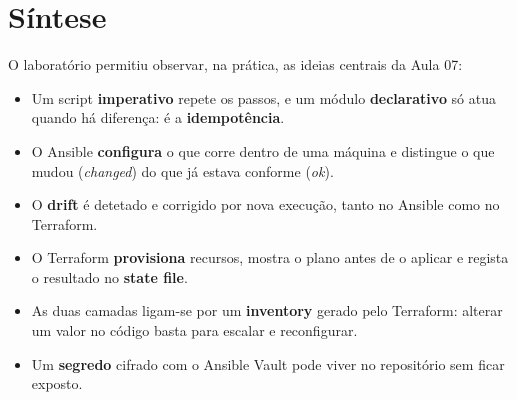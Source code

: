 \documentclass[11pt,a4paper]{article}
\begin{document}
\section*{Síntese}

O laboratório permitiu observar, na prática, as ideias centrais da Aula 07:

\begin{itemize}
  \item Um script \textbf{imperativo} repete os passos, e um módulo \textbf{declarativo} só atua quando há diferença: é a \textbf{idempotência}.
  \item O Ansible \textbf{configura} o que corre dentro de uma máquina e distingue o que mudou (\emph{changed}) do que já estava conforme (\emph{ok}).
  \item O \textbf{drift} é detetado e corrigido por nova execução, tanto no Ansible como no Terraform.
  \item O Terraform \textbf{provisiona} recursos, mostra o plano antes de o aplicar e regista o resultado no \textbf{state file}.
  \item As duas camadas ligam-se por um \textbf{inventory} gerado pelo Terraform: alterar um valor no código basta para escalar e reconfigurar.
  \item Um \textbf{segredo} cifrado com o Ansible Vault pode viver no repositório sem ficar exposto.
\end{itemize}
\end{document}
